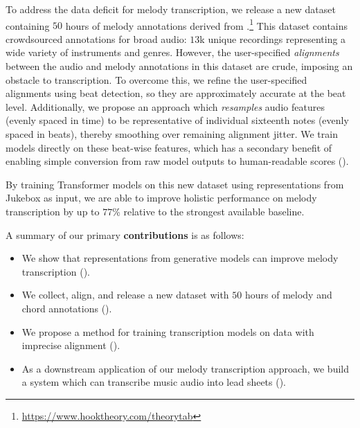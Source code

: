 To address the data deficit for melody transcription, 
we release a new dataset containing $50$ hours of melody annotations 
derived 
from \hooktheory.\footnote{\url{https://www.hooktheory.com/theorytab}} 
This dataset contains crowdsourced annotations for broad audio: 
$13$k unique recordings representing a wide variety of instruments and genres. 
However, the user-specified \emph{alignments} between the audio and melody annotations in this dataset are crude, imposing an obstacle to transcription. 
To overcome this, we refine the user-specified alignments using beat detection, so they are approximately accurate at the beat level. 
Additionally, we propose an approach which \emph{resamples} audio features (evenly spaced in time) to be representative of individual sixteenth notes (evenly spaced in beats), 
thereby smoothing over remaining alignment jitter. 
We train models directly on these beat-wise features, 
which has a secondary benefit of enabling simple conversion from raw model outputs to human-readable scores ().

By training Transformer models on this new dataset using representations from Jukebox as input, we are able to improve holistic performance on melody transcription by 
up to $77$\% 
relative to the strongest available baseline. 

A summary of our primary \textbf{contributions} is as follows:
\begin{itemize}
    \item We show that representations from generative models can improve melody transcription ().
    \item We collect, align, and release a new dataset with $50$ hours of melody and chord annotations ().
    \item We propose a method for training transcription models on data with imprecise alignment ().
    \item As a downstream application of our melody transcription approach, we build a system which can transcribe music audio into lead sheets ().
\end{itemize}